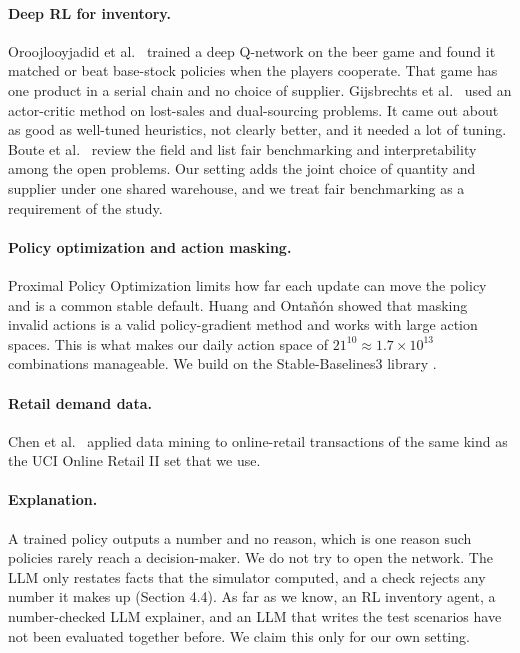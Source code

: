 \documentclass[10pt,twocolumn]{article}
\begin{document}
\paragraph{Deep RL for inventory.}
Oroojlooyjadid et al.\ \cite{beer} trained a deep Q-network on the beer game
and found it matched or beat base-stock policies when the players cooperate.
That game has one product in a serial chain and no choice of supplier.
Gijsbrechts et al.\ \cite{gijsbrechts} used an actor-critic method on
lost-sales and dual-sourcing problems. It came out about as good as well-tuned
heuristics, not clearly better, and it needed a lot of tuning. Boute et al.\
\cite{boute} review the field and list fair benchmarking and interpretability
among the open problems. Our setting adds the joint choice of quantity and
supplier under one shared warehouse, and we treat fair benchmarking as a
requirement of the study.

\paragraph{Policy optimization and action masking.}
Proximal Policy Optimization \cite{ppo} limits how far each update can move the
policy and is a common stable default. Huang and Ontañón \cite{masking} showed
that masking invalid actions is a valid policy-gradient method and works with
large action spaces. This is what makes our daily action space of
$21^{10}\approx 1.7\times10^{13}$ combinations manageable. We build on the
Stable-Baselines3 library \cite{sb3}.

\paragraph{Retail demand data.}
Chen et al.\ \cite{chen} applied data mining to online-retail transactions of
the same kind as the UCI Online Retail II set \cite{uci} that we use.

\paragraph{Explanation.}
A trained policy outputs a number and no reason, which is one reason such
policies rarely reach a decision-maker. We do not try to open the network.
The LLM only restates facts that the simulator computed, and a check rejects
any number it makes up (Section 4.4). As far as we know, an RL inventory agent,
a number-checked LLM explainer, and an LLM that writes the test scenarios have
not been evaluated together before. We claim this only for our own setting.
\end{document}
